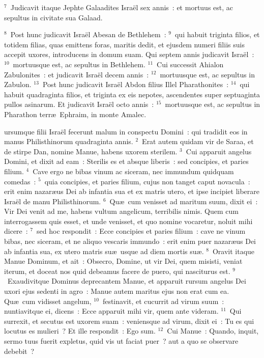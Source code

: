 ${}^{7}$~Judicavit itaque Jephte Galaadites Isra\"el sex annis~: et mortuus est, ac sepultus in civitate sua Galaad.


${}^{8}$~Post hunc judicavit Isra\"el Abesan de Bethlehem~:
${}^{9}$~qui habuit triginta filios, et totidem filias, quas emittens foras, maritis dedit, et ejusdem numeri filiis suis accepit uxores, introducens in domum suam. Qui septem annis judicavit Isra\"el~:
${}^{10}$~mortuusque est, ac sepultus in Bethlehem.
${}^{11}$~Cui successit Ahialon Zabulonites~: et judicavit Isra\"el decem annis~:
${}^{12}$~mortuusque est, ac sepultus in Zabulon.
${}^{13}$~Post hunc judicavit Isra\"el Abdon filius Illel Pharathonites~:
${}^{14}$~qui habuit quadraginta filios, et triginta ex eis nepotes, ascendentes super septuaginta pullos asinarum. Et judicavit Isra\"el octo annis~:
${}^{15}$~mortuusque est, ac sepultus in Pharathon terr\ae\ Ephraim, in monte Amalec.

\bchapter
{}ursumque filii Isra\"el fecerunt malum in conspectu Domini~: qui tradidit eos in manus Philisthinorum quadraginta annis.
${}^{2}$~Erat autem quidam vir de Saraa, et de stirpe Dan, nomine Manue, habens uxorem sterilem.
${}^{3}$~Cui apparuit angelus Domini, et dixit ad eam~: Sterilis es et absque liberis~: sed concipies, et paries filium.
${}^{4}$~Cave ergo ne bibas vinum ac siceram, nec immundum quidquam comedas~:
${}^{5}$~quia concipies, et paries filium, cujus non tanget caput novacula~: erit enim nazar\ae us Dei ab infantia sua et ex matris utero, et ipse incipiet liberare Isra\"el de manu Philisthinorum.
${}^{6}$~Qu\ae\ cum venisset ad maritum suum, dixit ei~: Vir Dei venit ad me, habens vultum angelicum, terribilis nimis. Quem cum interrogassem quis esset, et unde venisset, et quo nomine vocaretur, noluit mihi dicere~:
${}^{7}$~sed hoc respondit~: Ecce concipies et paries filium~: cave ne vinum bibas, nec siceram, et ne aliquo vescaris immundo~: erit enim puer nazar\ae us Dei ab infantia sua, ex utero matris su\ae\ usque ad diem mortis su\ae .
${}^{8}$~Oravit itaque Manue Dominum, et ait~: Obsecro, Domine, ut vir Dei, quem misisti, veniat iterum, et doceat nos quid debeamus facere de puero, qui nasciturus est.
${}^{9}$~Exaudivitque Dominus deprecantem Manue, et apparuit rursum angelus Dei uxori ejus sedenti in agro~: Manue autem maritus ejus non erat cum ea. Qu\ae\ cum vidisset angelum,
${}^{10}$~festinavit, et cucurrit ad virum suum~: nuntiavitque ei, dicens~: Ecce apparuit mihi vir, quem ante videram.
${}^{11}$~Qui surrexit, et secutus est uxorem suam~: veniensque ad virum, dixit ei~: Tu es qui locutus es mulieri~? Et ille respondit~: Ego sum.
${}^{12}$~Cui Manue~: Quando, inquit, sermo tuus fuerit expletus, quid vis ut faciat puer~? aut a quo se observare debebit~?


